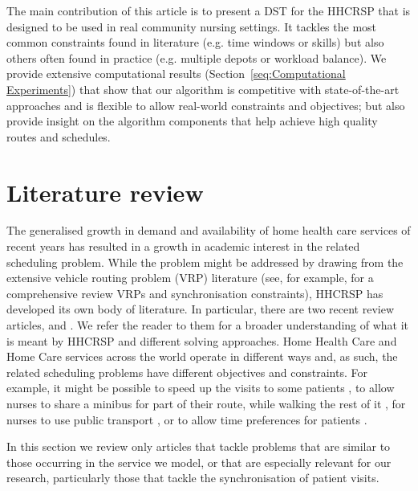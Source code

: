 \documentclass[a4paper,11pt]{elsarticle}
\begin{document}
The main contribution of this article is to present a DST for the HHCRSP that is designed to be used in real community nursing settings. It tackles the most common constraints found in literature (e.g. time windows or skills) but also others often found in practice (e.g. multiple depots or workload balance). We provide extensive computational results (Section~\ref{seq:Computational Experiments}) that show that our algorithm is competitive with state-of-the-art approaches and is flexible to allow real-world constraints and objectives; but also provide insight on the algorithm components that help achieve high quality routes and schedules. 

\section{Literature review}
The generalised growth in demand and availability of home health care services of recent years has resulted in a growth in academic interest in the related scheduling problem. While the problem might be addressed by drawing from the extensive vehicle routing problem (VRP) literature (see, for example, \cite{Drexl2012} for a comprehensive review VRPs and synchronisation constraints), HHCRSP has developed its own body of literature. In particular, there are two recent review articles, \cite{Cisse2017} and \cite{Fikar2017}. We refer the reader to them for a broader understanding of what it is meant by HHCRSP and different solving approaches. Home Health Care and Home Care services across the world operate in different ways and, as such, the related scheduling problems have different objectives and constraints. For example, it might be possible to speed up the visits to some patients \citep{Mosquera2018}, to allow nurses to share a minibus for part of their route, while walking the rest of it \citep{Fikar2015}, for nurses to use public transport \citep{Rest2016}, or to allow time preferences for patients \citep{Decerle2018}. %


In this section we review only articles that tackle problems that are similar to those occurring in the service we model, or that are especially relevant for our research, particularly those that tackle the synchronisation of patient visits.  
\end{document}
